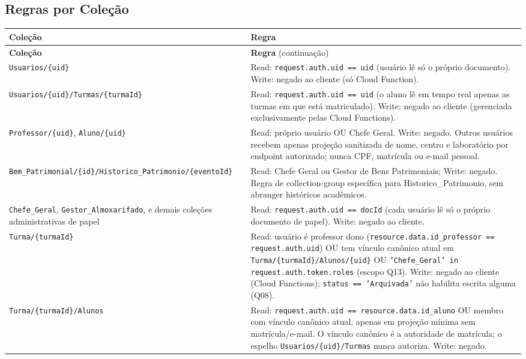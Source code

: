 \subsection{Regras por Coleção}

\small

\small
\setlength{\tabcolsep}{5pt}
\small
\setlength{\tabcolsep}{4pt}
\begin{longtable}{>{\raggedright\arraybackslash}p{} >{\raggedright\arraybackslash}p{}}
\toprule
\textbf{Coleção} & \textbf{Regra}\\
\midrule
\endfirsthead
\toprule
\textbf{Coleção} & \textbf{Regra} (continuação)\\
\midrule
\endhead
\bottomrule
\endfoot
\nolinkurl{Usuarios/\{uid\}} & Read: \texttt{request.auth.uid == uid} (usuário lê só o próprio documento). Write: negado ao cliente (só Cloud Function).\\
\nolinkurl{Usuarios/\{uid\}/Turmas/\{turmaId\}} & Read: \texttt{request.auth.uid == uid} (o aluno lê em tempo real apenas as turmas em que está matriculado). Write: negado ao cliente (gerenciada exclusivamente pelas Cloud Functions).\\
\texttt{Professor/\{uid\}}, \texttt{Aluno/\{uid\}} & Read: próprio usuário OU Chefe Geral. Write: negado. Outros usuários recebem apenas projeção sanitizada de nome, centro e laboratório por endpoint autorizado; nunca CPF, matrícula ou e-mail pessoal.\\
\nolinkurl{Bem\_Patrimonial/\{id\}/Historico\_Patrimonio/\{eventoId\}} & Read: Chefe Geral ou Gestor de Bens Patrimoniais; Write: negado. Regra de collection-group específica para Historico\_Patrimonio, sem abranger históricos acadêmicos.\\
\texttt{Chefe\_Geral}, \texttt{Gestor\_Almoxarifado}, e demais coleções administrativas de papel & Read: \texttt{request.auth.uid == docId} (cada usuário lê só o próprio documento de papel). Write: negado ao cliente.\\
\nolinkurl{Turma/\{turmaId\}} & Read: usuário é professor dono (\texttt{resource.data.id\_professor == request.auth.uid}) OU tem vínculo canônico atual em \texttt{Turma/\{turmaId\}/Alunos/\{uid\}} OU \texttt{'Chefe\_Geral' in request.auth.token.roles} (escopo Q13). Write: negado ao cliente (Cloud Functions); \texttt{status == 'Arquivada'} não habilita escrita alguma (Q08).\\
\nolinkurl{Turma/\{turmaId\}/Alunos} & Read: \texttt{request.auth.uid == resource.data.id\_aluno} OU membro com vínculo canônico atual, apenas em projeção mínima sem matrícula/e-mail. O vínculo canônico é a autoridade de matrícula; o espelho \nolinkurl{Usuarios/\{uid\}/Turmas} nunca autoriza. Write: negado.\\

\end{longtable}
